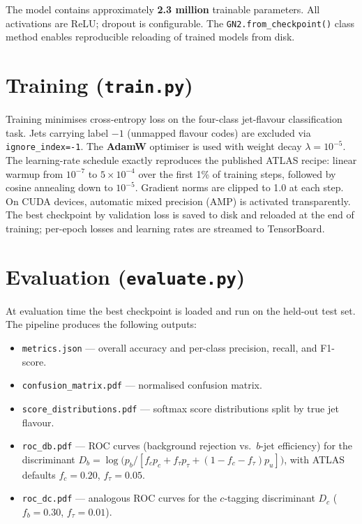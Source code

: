 \documentclass[11pt,a4paper]{article}
\begin{document}
The model contains approximately \textbf{2.3 million} trainable parameters.
All activations are ReLU; dropout is configurable.
The \texttt{GN2.from\_checkpoint()} class method enables reproducible
reloading of trained models from disk.

\section{Training (\texttt{train.py})}

Training minimises cross-entropy loss on the four-class jet-flavour
classification task.
Jets carrying label $-1$ (unmapped flavour codes) are excluded via
\texttt{ignore\_index=-1}.
The \textbf{AdamW} optimiser is used with weight decay
$\lambda = 10^{-5}$.
The learning-rate schedule exactly reproduces the published ATLAS recipe:
linear warmup from $10^{-7}$ to $5 \times 10^{-4}$ over the first 1\% of
training steps, followed by cosine annealing down to $10^{-5}$.
Gradient norms are clipped to 1.0 at each step.
On CUDA devices, automatic mixed precision (AMP) is activated transparently.
The best checkpoint by validation loss is saved to disk and reloaded at the
end of training; per-epoch losses and learning rates are streamed to
TensorBoard.

\section{Evaluation (\texttt{evaluate.py})}

At evaluation time the best checkpoint is loaded and run on the held-out test
set.
The pipeline produces the following outputs:

\begin{itemize}[leftmargin=*, itemsep=2pt, topsep=2pt]
  \item \texttt{metrics.json} --- overall accuracy and per-class
    precision, recall, and F1-score.
  \item \texttt{confusion\_matrix.pdf} --- normalised confusion matrix.
  \item \texttt{score\_distributions.pdf} --- softmax score distributions
    split by true jet flavour.
  \item \texttt{roc\_db.pdf} --- ROC curves (background rejection vs.\
    $b$-jet efficiency) for the discriminant
    $D_b = \log\!\bigl(p_b / [f_c p_c + f_\tau p_\tau +
    (1-f_c-f_\tau) p_u]\bigr)$,
    with ATLAS defaults $f_c = 0.20$, $f_\tau = 0.05$.
  \item \texttt{roc\_dc.pdf} --- analogous ROC curves for the $c$-tagging
    discriminant $D_c$ ($f_b = 0.30$, $f_\tau = 0.01$).
\end{itemize}
\end{document}
